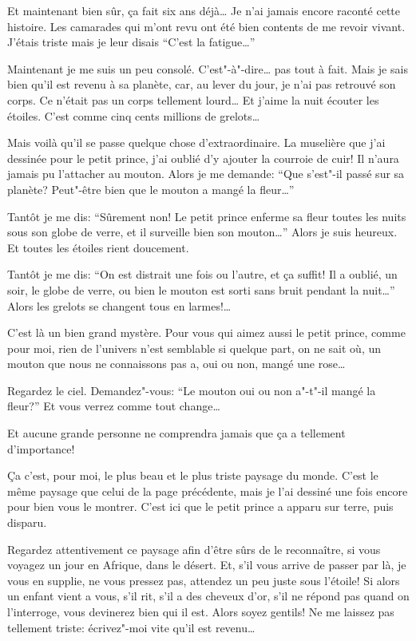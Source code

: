 Et maintenant bien sûr, ça fait six ans déjà\ldots{} Je n'ai jamais encore
raconté cette histoire. Les camarades qui m'ont revu ont été bien contents
de me revoir vivant. J'étais triste mais je leur disais ``C'est la fatigue\ldots{}''

Maintenant je me suis un peu consolé. C’est"-à"-dire\ldots{} pas tout à fait.
Mais je sais bien qu'il est revenu à sa planète, car, au lever du jour, je
n'ai pas retrouvé son corps. Ce n'était pas un corps tellement lourd\ldots{}
Et j'aime la nuit écouter les étoiles. C'est comme cinq cents millions de
grelots\ldots{}

Mais voilà qu'il se passe quelque chose d'extraordinaire. La muselière que 
j'ai dessinée pour le petit prince, j'ai oublié d'y ajouter la courroie de
cuir! Il n'aura jamais pu l'attacher au mouton. Alors je me demande: ``Que
s'est"-il passé sur sa planète? Peut"-être bien que le mouton a mangé la
fleur\ldots{}''

Tantôt je me dis: ``Sûrement non! Le petit prince enferme sa fleur toutes les
nuits sous son globe de verre, et il surveille bien son mouton\ldots{}'' Alors
je suis heureux. Et toutes les étoiles rient doucement.

Tantôt je me dis: ``On est distrait une fois ou l'autre, et ça suffit! Il a
oublié, un soir, le globe de verre, ou bien le mouton est sorti sans bruit
pendant la nuit\ldots{}'' Alors les grelots se changent tous en larmes!\ldots{}

\medskip

C'est là un bien grand mystère. Pour vous qui aimez aussi le petit prince,
comme pour moi, rien de l'univers n'est semblable si quelque part, on ne sait
où, un mouton que nous ne connaissons pas a, oui ou non, mangé une rose\ldots{}

Regardez le ciel. Demandez"-vous: ``Le mouton oui ou non a"-t"-il mangé la
fleur?'' Et vous verrez comme tout change\ldots{}

Et aucune grande personne ne comprendra jamais que ça a tellement d'importance!

Ça c'est, pour moi, le plus beau et le plus triste paysage du monde. C’est
le même paysage que celui de la page précédente, mais je l'ai dessiné une fois
encore pour bien vous le montrer. C'est ici que le petit prince a apparu sur
terre, puis disparu.

Regardez attentivement ce paysage afin d'être sûrs de le reconnaître, si vous
voyagez un jour en Afrique, dans le désert. Et, s'il vous arrive de passer par
là, je vous en supplie, ne vous pressez pas, attendez un peu juste sous l'étoile!
Si alors un enfant vient a vous, s'il rit, s'il a des cheveux d'or, s'il ne
répond pas quand on l'interroge, vous devinerez bien qui il est. Alors soyez
gentils! Ne me laissez pas tellement triste: écrivez"-moi vite qu'il est
revenu\ldots{}

